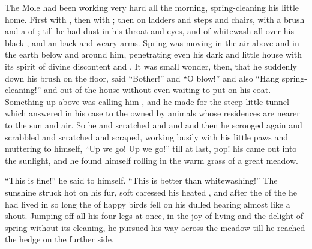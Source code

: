 \documentclass[troisieme]{fiche}
\begin{document}
\begin{texte}
The Mole had been working very hard all the morning, spring-cleaning his little home. First
with , then with ; then on ladders and steps and chairs, with a brush and a
 of ; till he had dust
in his throat and eyes, and  of whitewash all over
his black , and an  back and weary
arms. Spring was moving in the air above and in the earth below and around him, penetrating
even his dark and  little house with its spirit of divine discontent
and . It was small wonder, then, that he suddenly
 down his brush on the floor, said ``Bother!'' and ``O
blow!'' and also ``Hang spring-cleaning!'' and  out of the house
without even waiting to put on his coat. Something up above was calling him
, and he made for the steep little tunnel which
answered in his case to the  owned by animals whose residences are nearer to the sun and air. So
he  and scratched and
 and  and then he scrooged again and scrabbled and scratched and scraped, working
busily with his little paws and muttering to himself, ``Up we go! Up we go!'' till at last,
pop! his  came out into the sunlight, and he found himself
rolling in the warm grass of a great meadow.

``This is fine!'' he said to himself. ``This is better than whitewashing!'' The sunshine
struck hot on his fur, soft  caressed his heated
, and after the  of the
 he had lived in so long the  of happy birds fell on his dulled hearing almost like a shout. Jumping off all his four
legs at once, in the joy of living and the delight of spring without its cleaning, he pursued
his way across the meadow till he reached the hedge on the further side.
\end{texte}
\end{document}
